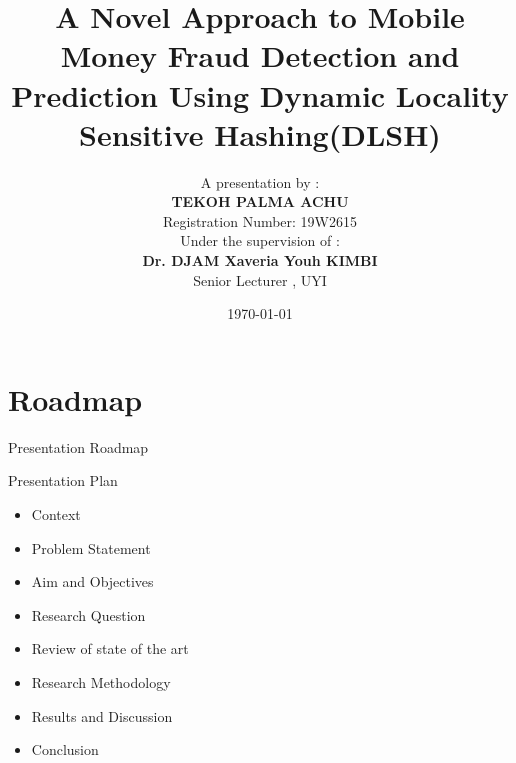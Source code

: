 \documentclass[11pt,aspectratio=169]{beamer}
\begin{document}
	

	
	\title[A Novel Approach to Mobile Money Fraud Detection and Prediction using DLSH]{A Novel Approach to Mobile Money Fraud Detection and Prediction Using Dynamic Locality Sensitive Hashing(DLSH)}
	
	
	
	\author[Tekoh Palma Achu $|$ 19W2615] %
	{ {A presentation by :} \vspace{0.1cm }  \\  \textbf{TEKOH PALMA ACHU} \\ Registration Number: 19W2615 \\ \vspace{0.25cm }
		 Under the supervision of : \vspace{0.1cm }\\ \textbf{Dr. DJAM Xaveria Youh KIMBI  } \\ Senior Lecturer , UYI}
	
	
	\date{\today}
	{
	\begin{frame}[plain]
		\maketitle
	\end{frame}
}

	\section{Roadmap}
	\begin{frame}{\centering {} Presentation Roadmap  }
		\begin{block}{\centering  Presentation Plan }
			\begin{itemize}
				\item Context
				\item Problem Statement
				\item Aim and Objectives
				\item Research Question
				\item Review of state of the art
				\item Research Methodology
				\item Results and Discussion
				\item Conclusion
				
			\end{itemize}
		\end{block}
	\end{frame}
\end{document}
